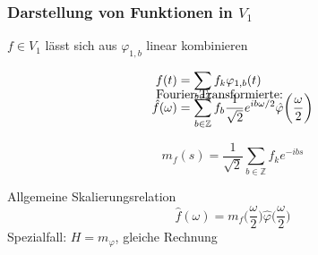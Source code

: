 %
%
%

\begin{frame}
\frametitle{Darstellung von Funktionen in $V_1$}

\begin{block}{$f\in V_1$ lässt sich aus $\varphi_{1,b}$ linear kombinieren}
\vspace{-20pt}

\begin{align*}
f(t)
&=
\sum_{b\in\mathbb Z} f_k \varphi_{1,b}(t)
\\[-15pt]
\intertext{\vspace{-10pt} Fourier-Transformierte:}
\hat{f}(\omega)
&=
\sum_{b\in\mathbb Z} f_b\frac{1}{\sqrt{2}} e^{ib\omega/2}
\hat{\varphi}\biggl(\frac{\omega}2\biggr)
\end{align*}
\end{block}

\vspace{-15pt}

\begin{definition}
\vspace{-10pt}
\[
m_f(s)
=
\frac{1}{\sqrt{2}}
\sum_{b\in\mathbb Z} f_k e^{-ibs}
\]
\end{definition}

\vspace{-15pt}

\begin{block}{Allgemeine Skalierungsrelation}
\vspace{-10pt}
\[
\hat{f}(\omega)
=
m_f\biggl(\frac{\omega}2\biggr)
\hat{\varphi}\biggl(\frac{\omega}2\biggr)
\]
Spezialfall: $H=m_\varphi$, gleiche Rechnung
\end{block}

\end{frame}
